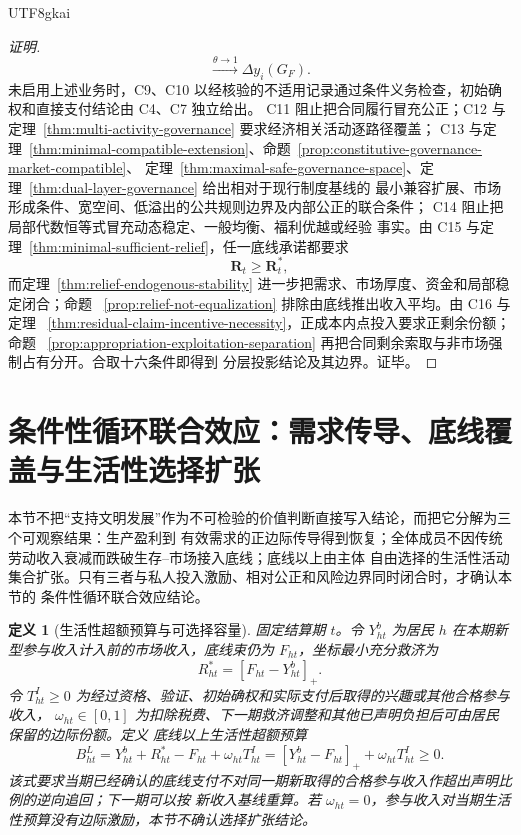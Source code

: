 \documentclass[12pt,a4paper,openany]{report}
\newtheorem{definition}{定义}[chapter]
\begin{document}
\begin{CJK*}{UTF8}{gkai}
\begin{proof}[证明]
\[  \xrightarrow{\theta\to1}
  \Delta y_i(G_F).
\]
未启用上述业务时，C9、C10 以经核验的不适用记录通过条件义务检查，初始确权和直接支付结论由 C4、C7 独立给出。
C11 阻止把合同履行冒充公正；C12 与定理~\ref{thm:multi-activity-governance} 要求经济相关活动逐路径覆盖；
C13 与定理~\ref{thm:minimal-compatible-extension}、命题~\ref{prop:constitutive-governance-market-compatible}、
定理~\ref{thm:maximal-safe-governance-space}、定理~\ref{thm:dual-layer-governance} 给出相对于现行制度基线的
最小兼容扩展、市场形成条件、宽空间、低溢出的公共规则边界及内部公正的联合条件；
C14 阻止把局部代数恒等式冒充动态稳定、一般均衡、福利优越或经验
事实。由 C15 与定理~\ref{thm:minimal-sufficient-relief}，任一底线承诺都要求
\[
  \mathbf R_t\ge\mathbf R_t^*,
\]
而定理~\ref{thm:relief-endogenous-stability} 进一步把需求、市场厚度、资金和局部稳定闭合；命题
~\ref{prop:relief-not-equalization} 排除由底线推出收入平均。由 C16 与定理
~\ref{thm:residual-claim-incentive-necessity}，正成本内点投入要求正剩余份额；命题
~\ref{prop:appropriation-exploitation-separation} 再把合同剩余索取与非市场强制占有分开。合取十六条件即得到
分层投影结论及其边界。证毕。
\end{proof}

\section{条件性循环联合效应：需求传导、底线覆盖与生活性选择扩张}
\label{sec:strategic-value}

本节不把“支持文明发展”作为不可检验的价值判断直接写入结论，而把它分解为三个可观察结果：生产盈利到
有效需求的正边际传导得到恢复；全体成员不因传统劳动收入衰减而跌破生存--市场接入底线；底线以上由主体
自由选择的生活性活动集合扩张。只有三者与私人投入激励、相对公正和风险边界同时闭合时，才确认本节的
条件性循环联合效应结论。

\begin{definition}[生活性超额预算与可选择容量]
固定结算期 \(t\)。令 \(Y_{ht}^{b}\) 为居民 \(h\) 在本期新型参与收入计入前的市场收入，底线束仍为
\(F_{ht}\)，坐标最小充分救济为
\[
  R_{ht}^{*}=[F_{ht}-Y_{ht}^{b}]_+.
\]
令 \(T_{ht}^{I}\ge0\) 为经过资格、验证、初始确权和实际支付后取得的兴趣或其他合格参与收入，
\(\omega_{ht}\in[0,1]\) 为扣除税费、下一期救济调整和其他已声明负担后可由居民保留的边际份额。定义
底线以上生活性超额预算
\[
  B_{ht}^{L}
  =Y_{ht}^{b}+R_{ht}^{*}-F_{ht}+\omega_{ht}T_{ht}^{I}
  =[Y_{ht}^{b}-F_{ht}]_++\omega_{ht}T_{ht}^{I}\ge0.
\]
该式要求当期已经确认的底线支付不对同一期新取得的合格参与收入作超出声明比例的逆向追回；下一期可以按
新收入基线重算。若 \(\omega_{ht}=0\)，参与收入对当期生活性预算没有边际激励，本节不确认选择扩张结论。


\end{definition}
\end{CJK*}
\end{document}
